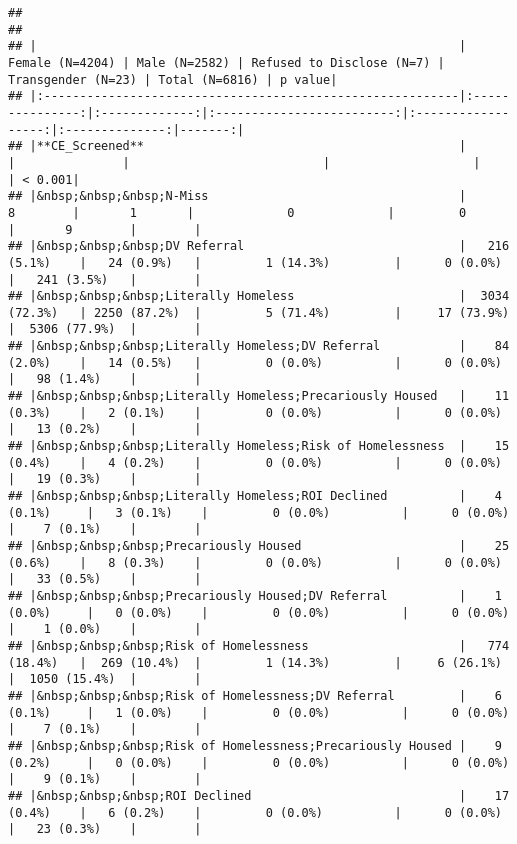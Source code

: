 \documentclass[
]{article}
\begin{document}
\begin{verbatim}
## 
## 
## |                                                           | Female (N=4204) | Male (N=2582) | Refused to Disclose (N=7) | Transgender (N=23) | Total (N=6816) | p value|
## |:----------------------------------------------------------|:---------------:|:-------------:|:-------------------------:|:------------------:|:--------------:|-------:|
## |**CE_Screened**                                            |                 |               |                           |                    |                | < 0.001|
## |&nbsp;&nbsp;&nbsp;N-Miss                                   |        8        |       1       |             0             |         0          |       9        |        |
## |&nbsp;&nbsp;&nbsp;DV Referral                              |   216 (5.1%)    |   24 (0.9%)   |         1 (14.3%)         |      0 (0.0%)      |   241 (3.5%)   |        |
## |&nbsp;&nbsp;&nbsp;Literally Homeless                       |  3034 (72.3%)   | 2250 (87.2%)  |         5 (71.4%)         |     17 (73.9%)     |  5306 (77.9%)  |        |
## |&nbsp;&nbsp;&nbsp;Literally Homeless;DV Referral           |    84 (2.0%)    |   14 (0.5%)   |         0 (0.0%)          |      0 (0.0%)      |   98 (1.4%)    |        |
## |&nbsp;&nbsp;&nbsp;Literally Homeless;Precariously Housed   |    11 (0.3%)    |   2 (0.1%)    |         0 (0.0%)          |      0 (0.0%)      |   13 (0.2%)    |        |
## |&nbsp;&nbsp;&nbsp;Literally Homeless;Risk of Homelessness  |    15 (0.4%)    |   4 (0.2%)    |         0 (0.0%)          |      0 (0.0%)      |   19 (0.3%)    |        |
## |&nbsp;&nbsp;&nbsp;Literally Homeless;ROI Declined          |    4 (0.1%)     |   3 (0.1%)    |         0 (0.0%)          |      0 (0.0%)      |    7 (0.1%)    |        |
## |&nbsp;&nbsp;&nbsp;Precariously Housed                      |    25 (0.6%)    |   8 (0.3%)    |         0 (0.0%)          |      0 (0.0%)      |   33 (0.5%)    |        |
## |&nbsp;&nbsp;&nbsp;Precariously Housed;DV Referral          |    1 (0.0%)     |   0 (0.0%)    |         0 (0.0%)          |      0 (0.0%)      |    1 (0.0%)    |        |
## |&nbsp;&nbsp;&nbsp;Risk of Homelessness                     |   774 (18.4%)   |  269 (10.4%)  |         1 (14.3%)         |     6 (26.1%)      |  1050 (15.4%)  |        |
## |&nbsp;&nbsp;&nbsp;Risk of Homelessness;DV Referral         |    6 (0.1%)     |   1 (0.0%)    |         0 (0.0%)          |      0 (0.0%)      |    7 (0.1%)    |        |
## |&nbsp;&nbsp;&nbsp;Risk of Homelessness;Precariously Housed |    9 (0.2%)     |   0 (0.0%)    |         0 (0.0%)          |      0 (0.0%)      |    9 (0.1%)    |        |
## |&nbsp;&nbsp;&nbsp;ROI Declined                             |    17 (0.4%)    |   6 (0.2%)    |         0 (0.0%)          |      0 (0.0%)      |   23 (0.3%)    |        |
\end{verbatim}
\end{document}
